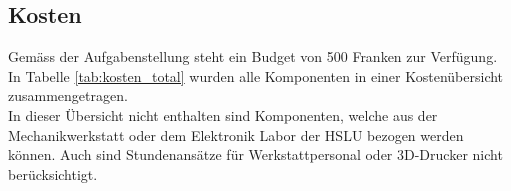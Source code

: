 \documentclass[../../main.tex]{subfiles}
\begin{document}
\begin{comment}
    Schlussdiskussion mit
    - Entwicklungskosten, zeitlicher Entwicklungsaufwand
    - Erfahrungen, „Lessons learned“, kritische Würdigung der Arbeiten
    - offene Punkte, Risiken und Ausblick
\end{comment}

\subsection{Kosten}
Gemäss der Aufgabenstellung steht ein Budget von 500 Franken zur Verfügung. In Tabelle \ref{tab:kosten_total} wurden alle Komponenten in einer Kostenübersicht zusammengetragen.\\
In dieser Übersicht nicht enthalten sind Komponenten, welche aus der Mechanikwerkstatt oder dem Elektronik Labor der
HSLU bezogen werden können. Auch sind Stundenansätze für Werkstattpersonal oder 3D-Drucker nicht berücksichtigt. \\
\end{document}
